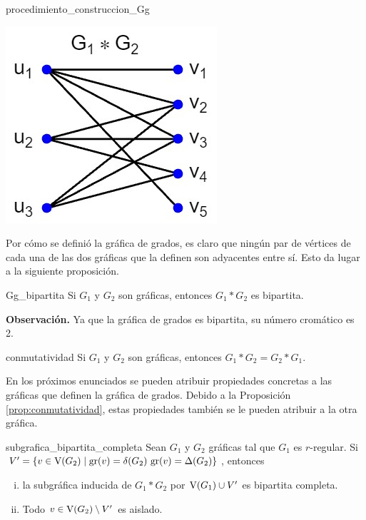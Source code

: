 \documentclass[fleqn, 11pt]{article}
\begin{document}
\begin{ejemplo}[breakable, pad at break = 4mm, beforeafter skip = 3mm]{}{procedimiento_construccion_Gg}
\begin{enumerate}
            \begin{center}
                \includegraphics[width=0.3\linewidth]{Ejemplo_1/Ejemplo1_Gg.jpg}
            \end{center}
        \end{enumerate}
    \end{ejemplo}

    Por cómo se definió la gráfica de grados, es claro que ningún par de vértices de cada una de las dos gráficas que la definen son adyacentes entre sí. Esto da lugar a la siguiente proposición.

    \begin{proposicion}[beforeafter skip = 4mm]{}{Gg_bipartita}
        Si $ G_1 $ y $ G_2 $ son gráficas, entonces $ G_1 \ast G_2 $ es bipartita.
    \end{proposicion}

    \textbf{Observación.} Ya que la gráfica de grados es bipartita, su número cromático es 2.

    \begin{proposicion}[beforeafter skip = 4mm]{}{conmutatividad}
            Si $ G_1 $ y $ G_2 $ son gráficas, entonces $ G_1 \ast G_2 = G_2 \ast G_1 $.
    \end{proposicion}

    En los próximos enunciados se pueden atribuir propiedades concretas a las gráficas que definen la gráfica de grados. Debido a la Proposición \eqref{prop:conmutatividad}, estas propiedades también se le pueden atribuir a la otra gráfica.

    \begin{teorema}[beforeafter skip = 4mm]{}{subgrafica_bipartita_completa}
        Sean $ G_1 $ y $ G_2 $ gráficas tal que $ G_1 $ es $ r $-regular. Si $ V' = \left\lbrace v \in \textnormal{V}(G_2) \mid \textnormal{gr}(v) = \delta(G_2) \textnormal{ gr}(v) = \Delta(G_2) \right\rbrace $, entonces \vspace{3mm}
        
        \begin{enumerate}[i)]
            \item la subgráfica inducida de $ G_1 \ast G_2 $ por $ \textnormal{V}(G_1) \cup V' $ es bipartita completa.
            \item Todo $ v \in \textnormal{V}(G_2) \setminus V' $ es aislado.
        \end{enumerate}
    \end{teorema}
\end{document}
